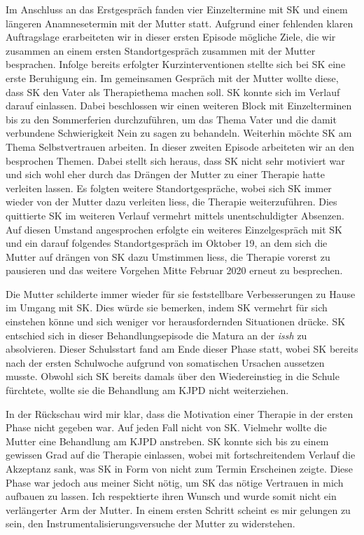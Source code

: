 Im Anschluss an das Erstgespräch fanden vier Einzeltermine mit SK und einem längeren Anamnesetermin mit der Mutter statt. Aufgrund einer fehlenden klaren Auftragslage erarbeiteten wir in dieser ersten Episode mögliche Ziele, die wir zusammen an einem ersten Standortgespräch zusammen mit der Mutter besprachen. Infolge bereits erfolgter Kurzinterventionen stellte sich bei SK eine erste Beruhigung ein. Im gemeinsamen Gespräch mit der Mutter wollte diese, dass SK den Vater als Therapiethema machen soll. SK konnte sich im Verlauf darauf einlassen. Dabei beschlossen wir einen weiteren Block mit Einzelterminen bis zu den Sommerferien durchzuführen, um das Thema Vater und die damit verbundene Schwierigkeit Nein zu sagen zu behandeln. Weiterhin möchte SK am Thema Selbstvertrauen arbeiten. In dieser zweiten Episode arbeiteten wir an den besprochen Themen. Dabei stellt sich heraus, dass SK nicht sehr motiviert war und sich wohl eher durch das Drängen der Mutter zu einer Therapie hatte verleiten lassen. Es folgten weitere Standortgespräche, wobei sich SK immer wieder von der Mutter dazu verleiten liess, die Therapie weiterzuführen. Dies quittierte SK im weiteren Verlauf vermehrt mittels unentschuldigter Absenzen. Auf diesen Umstand angesprochen erfolgte ein weiteres Einzelgespräch mit SK und ein darauf folgendes Standortgespräch im Oktober 19, an dem sich die Mutter auf drängen von SK dazu Umstimmen liess, die Therapie vorerst zu pausieren und das weitere Vorgehen Mitte Februar 2020 erneut zu besprechen.

Die Mutter schilderte immer wieder für sie feststellbare Verbesserungen zu Hause im Umgang mit SK. Dies würde sie bemerken, indem SK vermehrt für sich einstehen könne und sich weniger vor herausfordernden Situationen drücke. SK entschied sich in dieser Behandlungsepisode die Matura an der \textit{\ac{issh}} zu absolvieren. Dieser Schulsstart fand am Ende dieser Phase statt, wobei SK bereits nach der ersten Schulwoche aufgrund von somatischen Ursachen aussetzen musste. Obwohl sich SK bereits damals über den Wiedereinstieg in die Schule fürchtete, wollte sie die Behandlung am KJPD nicht weiterziehen. 
 
In der Rückschau wird mir klar, dass die Motivation einer Therapie in der ersten Phase nicht gegeben war. Auf jeden Fall nicht von SK. Vielmehr wollte die Mutter eine Behandlung am KJPD anstreben. SK konnte sich bis zu einem gewissen Grad auf die Therapie einlassen, wobei mit fortschreitendem Verlauf die Akzeptanz sank, was SK in Form von nicht zum Termin Erscheinen zeigte. Diese Phase war jedoch aus meiner Sicht nötig, um SK das nötige Vertrauen in mich aufbauen zu lassen. Ich respektierte ihren Wunsch und wurde somit nicht ein verlängerter Arm der Mutter. In einem ersten Schritt scheint es mir gelungen zu sein, den Instrumentalisierungsversuche der Mutter zu widerstehen.  


